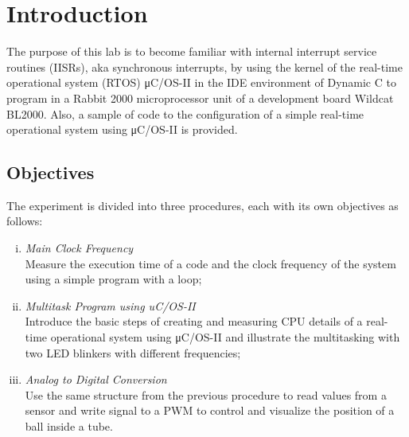 \section{Introduction}

The purpose of this lab is to become familiar with internal interrupt service routines (IISRs), aka synchronous interrupts, by using the kernel of the real-time operational system (RTOS) μC/OS-II in the IDE environment of Dynamic C to program in a Rabbit 2000 microprocessor unit of a development board Wildcat BL2000. Also, a sample of code to the configuration of a simple real-time operational system using μC/OS-II is provided.

\subsection{Objectives}
The experiment is divided into three procedures, each with its own objectives as follows:

\begin{enumerate}[(i)]
\item
\textit{Main Clock Frequency}\\
Measure the execution time of a code and the clock frequency of the system using a simple program with a loop;
\\
\item
\textit{Multitask Program using uC/OS-II}\\
Introduce the basic steps of creating and measuring CPU details of a real-time operational system using μC/OS-II and illustrate the multitasking with two LED blinkers with different frequencies;
\\
\item
\textit{Analog to Digital Conversion}
\\Use the same structure from the previous procedure to read values from a sensor and write signal to a PWM to control and visualize the position of a ball inside a tube.
\end{enumerate}

\begin{lstlisting}[frame=single]
\end{lstlisting}